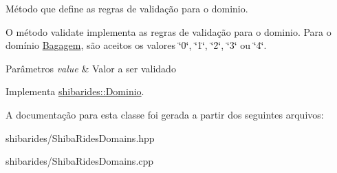 Método que define as regras de validação para o dominio. 

O método validate implementa as regras de validação para o dominio. Para o domínio \hyperlink{classshibarides_1_1Bagagem}{Bagagem}, são aceitos os valores \char`\"{}0\char`\"{}, \char`\"{}1\char`\"{}, \char`\"{}2\char`\"{}, \char`\"{}3\char`\"{} ou \char`\"{}4\char`\"{}.


\begin{DoxyParams}{Parâmetros}
{\em value} & Valor a ser validado \\
\hline
\end{DoxyParams}


Implementa \hyperlink{classshibarides_1_1Dominio_acc9445531455c072bbf708709aebbe55}{shibarides\+::\+Dominio}.



A documentação para esta classe foi gerada a partir dos seguintes arquivos\+:\begin{DoxyCompactItemize}
\item 
shibarides/Shiba\+Rides\+Domains.\+hpp\item 
shibarides/Shiba\+Rides\+Domains.\+cpp\end{DoxyCompactItemize}
